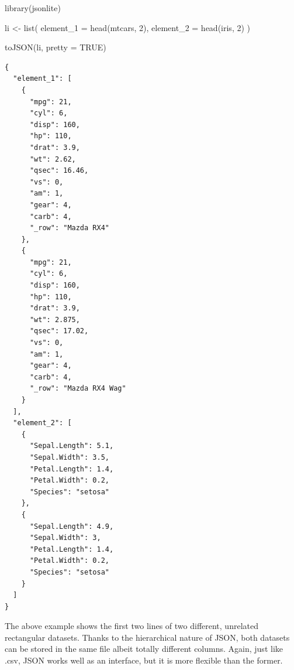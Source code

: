\documentclass[
  12pt,
  letterpaper,
]{krantz}
\newenvironment{Shaded}{\begin{snugshade}}{\end{snugshade}}
\newcommand{\AttributeTok}[1]{\textcolor[rgb]{0.40,0.45,0.13}{#1}}
\newcommand{\ConstantTok}[1]{\textcolor[rgb]{0.56,0.35,0.01}{#1}}
\newcommand{\DecValTok}[1]{\textcolor[rgb]{0.68,0.00,0.00}{#1}}
\newcommand{\FunctionTok}[1]{\textcolor[rgb]{0.28,0.35,0.67}{#1}}
\newcommand{\NormalTok}[1]{\textcolor[rgb]{0.00,0.23,0.31}{#1}}
\newcommand{\OtherTok}[1]{\textcolor[rgb]{0.00,0.23,0.31}{#1}}
\begin{document}
\normalsize

\begin{Shaded}
\begin{Highlighting}[]
\FunctionTok{library}\NormalTok{(jsonlite)}

\NormalTok{li }\OtherTok{\textless{}{-}} \FunctionTok{list}\NormalTok{(}
  \AttributeTok{element\_1 =} \FunctionTok{head}\NormalTok{(mtcars, }\DecValTok{2}\NormalTok{),}
  \AttributeTok{element\_2 =} \FunctionTok{head}\NormalTok{(iris, }\DecValTok{2}\NormalTok{)}
\NormalTok{)}

\FunctionTok{toJSON}\NormalTok{(li, }\AttributeTok{pretty =} \ConstantTok{TRUE}\NormalTok{)}
\end{Highlighting}
\end{Shaded}

\begin{verbatim}
{
  "element_1": [
    {
      "mpg": 21,
      "cyl": 6,
      "disp": 160,
      "hp": 110,
      "drat": 3.9,
      "wt": 2.62,
      "qsec": 16.46,
      "vs": 0,
      "am": 1,
      "gear": 4,
      "carb": 4,
      "_row": "Mazda RX4"
    },
    {
      "mpg": 21,
      "cyl": 6,
      "disp": 160,
      "hp": 110,
      "drat": 3.9,
      "wt": 2.875,
      "qsec": 17.02,
      "vs": 0,
      "am": 1,
      "gear": 4,
      "carb": 4,
      "_row": "Mazda RX4 Wag"
    }
  ],
  "element_2": [
    {
      "Sepal.Length": 5.1,
      "Sepal.Width": 3.5,
      "Petal.Length": 1.4,
      "Petal.Width": 0.2,
      "Species": "setosa"
    },
    {
      "Sepal.Length": 4.9,
      "Sepal.Width": 3,
      "Petal.Length": 1.4,
      "Petal.Width": 0.2,
      "Species": "setosa"
    }
  ]
} 
\end{verbatim}

\normalsize

The above example shows the first two lines of two different, unrelated
rectangular datasets. Thanks to the hierarchical nature of JSON, both
datasets can be stored in the same file albeit totally different
columns. Again, just like .csv, JSON works well as an interface, but it
is more flexible than the former.
\end{document}
